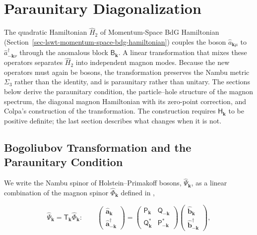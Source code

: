 
\hypertarget{sec-lswt-paraunitary-diagonalization}{%
\section{Paraunitary Diagonalization}\label{sec-lswt-paraunitary-diagonalization}}

The quadratic Hamiltonian \(\hat H_2\) of Momentum-Space BdG Hamiltonian (Section~\ref{sec-lswt-momentum-space-bdg-hamiltonian}) couples the boson \(\hat a_{\mathbf k\mu}\) to \(\hat a_{-\mathbf k\nu}^\dagger\) through the anomalous block \(\mathsf B_{\mathbf k}\). A linear transformation that mixes these operators separates \(\hat H_2\) into independent magnon modes. Because the new operators must again be bosons, the transformation preserves the Nambu metric \(\Sigma_3\) rather than the identity, and is paraunitary rather than unitary. The sections below derive the paraunitary condition, the particle--hole structure of the magnon spectrum, the diagonal magnon Hamiltonian with its zero-point correction, and Colpa's construction of the transformation. The construction requires \(\mathsf H_{\mathbf k}\) to be positive definite; the last section describes what changes when it is not.

\subsection{Bogoliubov Transformation and the Paraunitary Condition}

We write the Nambu spinor of Holstein--Primakoff bosons, \(\hat\Psi_{\mathbf k}\), as a linear combination of the magnon spinor \(\hat\Phi_{\mathbf k}\) defined in ,

\begin{equation}\label{eq-lswt-bogoliubov-transformation}
\hat\Psi_{\mathbf k}=\mathsf T_{\mathbf k}\hat\Phi_{\mathbf k}:
\qquad
\begin{pmatrix}
\hat{\mathbf a}_{\mathbf k}\\
\hat{\mathbf a}_{-\mathbf k}^\dagger
\end{pmatrix}
=\begin{pmatrix}
\mathsf P_{\mathbf k} & \mathsf Q_{-\mathbf k}\\
\mathsf Q_{\mathbf k}^* & \mathsf P_{-\mathbf k}^*
\end{pmatrix}
\begin{pmatrix}
\hat{\mathbf b}_{\mathbf k}\\
\hat{\mathbf b}_{-\mathbf k}^\dagger
\end{pmatrix},
\end{equation}

